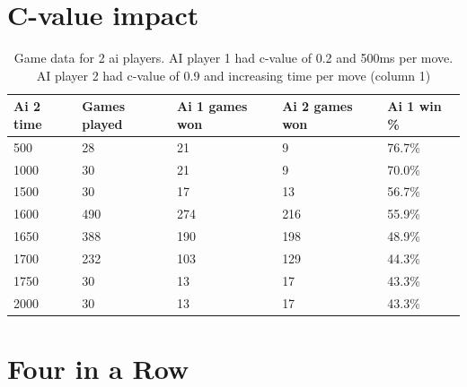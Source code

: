 \documentclass[
11pt, %
english, %
singlespacing, %
headsepline, %
]{MastersDoctoralThesis} %
\begin{document}
\begin{appendices}
\section{C-value impact}
\begin{table}[H]
	\begin{tabular}{|l||l|l|l|l|}
		\hline
		Ai 2 time & Games played & Ai 1 games won & Ai 2 games won & Ai 1 win \% \\ \hline \hline
		500       & 28           & 21             & 9              & 76.7\%      \\ \hline
		1000      & 30           & 21             & 9              & 70.0\%      \\ \hline
		1500      & 30           & 17             & 13             & 56.7\%      \\ \hline
		1600      & 490          & 274            & 216            & 55.9\%      \\ \hline
		1650      & 388          & 190            & 198            & 48.9\%      \\ \hline
		1700      & 232          & 103            & 129            & 44.3\%      \\ \hline
		1750      & 30           & 13             & 17             & 43.3\%      \\ \hline
		2000      & 30           & 13             & 17             & 43.3\%      \\ \hline
	\end{tabular}
	\centering
	\caption{Game data for 2 ai players. AI player 1 had c-value of 0.2 and 500ms per move. AI player 2 had c-value of 0.9 and increasing time per move (column 1)}
	\label{table:impact-02-09}
\end{table}
\vfill
\pagebreak
\section{Four in a Row}

\end{appendices}
\end{document}
